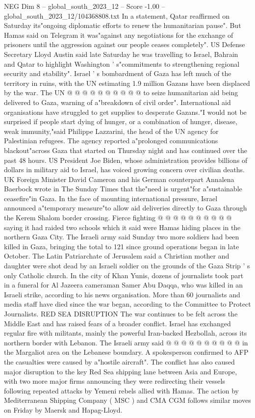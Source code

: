 \begin{textsample}{NEG Dim 8 – global\_south\_2023\_12 – Score -1.00 – global\_south\_2023\_12/104368808.txt}
In a statement, Qatar reaffirmed on Saturday its"ongoing diplomatic efforts to renew the humanitarian pause".
But Hamas said on Telegram it was"against any negotiations for the exchange of prisoners until the aggression against our people ceases completely".
US Defense Secretary Lloyd Austin said late Saturday he was travelling to Israel, Bahrain and Qatar to highlight Washington ' s"commitments to strengthening regional security and stability".
Israel ' s bombardment of Gaza has left much of the territory in ruins, with the UN estimating 1.9 million Gazans have been displaced by the war.
The UN @ @ @ @ @ @ @ @ @ @ to seize humanitarian aid being delivered to Gaza, warning of a"breakdown of civil order".
International aid organisations have struggled to get supplies to desperate Gazans."I would not be surprised if people start dying of hunger, or a combination of hunger, disease, weak immunity,"said Philippe Lazzarini, the head of the UN agency for Palestinian refugees.
The agency reported a"prolonged communications blackout"across Gaza that started on Thursday night and has continued over the past 48 hours.
US President Joe Biden, whose administration provides billions of dollars in military aid to Israel, has voiced growing concern over civilian deaths.
UK Foreign Minister David Cameron and his German counterpart Annalena Baerbock wrote in The Sunday Times that the"need is urgent"for a"sustainable ceasefire"in Gaza.
In the face of mounting international pressure, Israel announced a"temporary measure"to allow aid deliveries directly to Gaza through the Kerem Shalom border crossing.
Fierce fighting @ @ @ @ @ @ @ @ @ @ saying it had raided two schools which it said were Hamas hiding places in the northern Gaza City.
The Israeli army said Sunday two more soldiers had been killed in Gaza, bringing the total to 121 since ground operations began in late October.
The Latin Patriarchate of Jerusalem said a Christian mother and daughter were shot dead by an Israeli soldier on the grounds of the Gaza Strip ' s only Catholic church.
In the city of Khan Yunis, dozens of journalists took part in a funeral for Al Jazeera cameraman Samer Abu Daqqa, who was killed in an Israeli strike, according to his news organisation.
More than 60 journalists and media staff have died since the war began, according to the Committee to Protect Journalists.
RED SEA DISRUPTION The war continues to be felt across the Middle East and has raised fears of a broader conflict.
Israel has exchanged regular fire with militants, mainly the powerful Iran-backed Hezbollah, across its northern border with Lebanon.
The Israeli army said @ @ @ @ @ @ @ @ @ @ in the Margaliot area on the Lebanese boundary.
A spokesperson confirmed to AFP the casualties were caused by a"hostile aircraft".
The conflict has also caused major disruption to the key Red Sea shipping lane between Asia and Europe, with two more major firms announcing they were redirecting their vessels following repeated attacks by Yemeni rebels allied with Hamas.
The action by Mediterranean Shipping Company ( MSC ) and CMA CGM follows similar moves on Friday by Maersk and Hapag-Lloyd.

\end{textsample}
